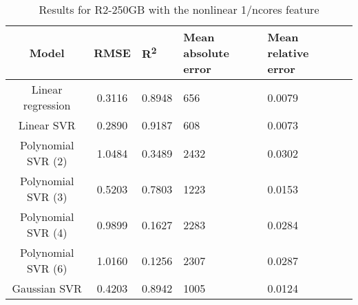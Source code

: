 \begin{table}[H]
\centering
\begin{adjustbox}{center}
\begin{tabular}{c | c M{1.2cm} M{2.5cm} M{2.5cm} M{1.8cm}}
Model & RMSE & R\textsuperscript{2} & Mean absolute error & Mean relative error \tabularnewline
\hline
Linear regression & 0.3116 & 0.8948 &    656 & 0.0079 \\
Linear SVR & 0.2890 & 0.9187 &    608 & 0.0073 \\
Polynomial SVR (2) & 1.0484 & 0.3489 &   2432 & 0.0302 \\
Polynomial SVR (3) & 0.5203 & 0.7803 &   1223 & 0.0153 \\
Polynomial SVR (4) & 0.9899 & 0.1627 &   2283 & 0.0284 \\
Polynomial SVR (6) & 1.0160 & 0.1256 &   2307 & 0.0287 \\
Gaussian SVR & 0.4203 & 0.8942 &   1005 & 0.0124 \\
\end{tabular}
\end{adjustbox}
\\
\caption{Results for R2-250GB with the nonlinear 1/ncores feature}
\label{tab:all_nonlinear_R2_250}
\end{table}
